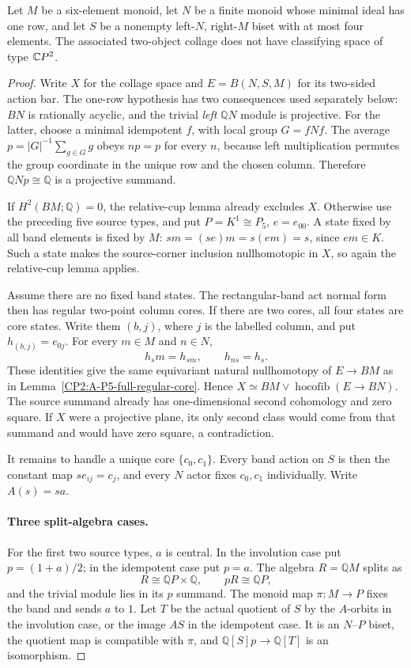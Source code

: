 \begin{theorem}
\label{CP2:A-six-one-row-four-states}
Let $M$ be a six-element monoid, let $N$ be a finite monoid
whose minimal ideal has one row, and let $S$ be a nonempty
left-$N$, right-$M$ biset with at most four elements.
The associated two-object collage does not have
classifying space of type $\mathbb{C}P^2$.
\end{theorem}
\begin{proof}
Write $X$ for the collage space and $E=B(N,S,M)$ for its
two-sided action bar. The one-row hypothesis has two
consequences used separately below: $BN$ is rationally
acyclic, and the trivial \emph{left} $\mathbb QN$ module
is projective. For the latter, choose a minimal idempotent
$f$, with local group $G=fNf$. The average
$p=|G|^{-1}\sum_{g\in G}g$ obeys $np=p$ for every $n$,
because left multiplication permutes the group coordinate
in the unique row and the chosen column. Therefore
$\mathbb QN p\cong\mathbb Q$ is a projective summand.

If $H^2(BM;\mathbb Q)=0$, the relative-cup lemma already
excludes $X$. Otherwise use the preceding five source
types, and put $P=K^1\cong P_5$, $e=e_{00}$.
A state fixed by all band elements is fixed by $M$:
$sm=(se)m=s(em)=s$, since $em\in K$. Such a state makes
the source-corner inclusion nullhomotopic in $X$, so again
the relative-cup lemma applies.

Assume there are no fixed band states. The rectangular-band
act normal form then has regular two-point column cores.
If there are two cores, all four states are core states.
Write them $(b,j)$, where $j$ is the labelled column, and
put $h_{(b,j)}=e_{0j}$. For every $m\in M$ and $n\in N$,
\[
 h_s m=h_{sm},\qquad h_{ns}=h_s.
\]
These identities give the same equivariant natural
nullhomotopy of $E\to BM$ as in
Lemma~\ref{CP2:A-P5-full-regular-core}. Hence
$X\simeq BM\vee\operatorname{hocofib}(E\to BN)$.
The source summand already has one-dimensional second
cohomology and zero square. If $X$ were a projective plane,
its only second class would come from that summand and
would have zero square, a contradiction.

It remains to handle a unique core $\{c_0,c_1\}$.
Every band action on $S$ is then the constant map
$se_{ij}=c_j$, and every $N$ actor fixes $c_0,c_1$
individually. Write $A(s)=sa$.

\paragraph{Three split-algebra cases.}
For the first two source types, $a$ is central. In the
involution case put $p=(1+a)/2$; in the idempotent case
put $p=a$. The algebra $R=\mathbb QM$ splits as
\[
 R\cong\mathbb QP\times\mathbb Q,
 \qquad pR\cong\mathbb QP,
\]
and the trivial module lies in its $p$ summand. The monoid
map $\pi:M\to P$ fixes the band and sends $a$ to $1$.
Let $T$ be the actual quotient of $S$ by the $A$-orbits
in the involution case, or the image $AS$ in the idempotent
case. It is an $N$--$P$ biset, the quotient map is compatible
with $\pi$, and
$\mathbb Q[S]p\to\mathbb Q[T]$ is an isomorphism.


\end{proof}
